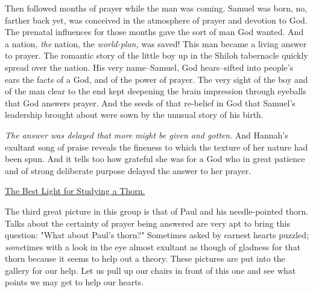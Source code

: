Then followed months of prayer while the man was coming. Samuel was born,
no, farther back yet, was conceived in the atmosphere of prayer and
devotion to God. The prenatal influences for those months gave the sort of
man God wanted. And a nation, \textit{the} nation, the \textit{world-plan,} was saved!
This man became a living answer to prayer. The romantic story of the
little boy up in the Shiloh tabernacle quickly spread over the nation. His
very name--Samuel, God hears--sifted into people's ears the facts of a
God, and of the power of prayer. The very sight of the boy and of the man
clear to the end kept deepening the brain impression through eyeballs that
God answers prayer. And the seeds of that re-belief in God that Samuel's
leadership brought about were sown by the unusual story of his birth.

\textit{The answer was delayed that more might be given and gotten}. And Hannah's
exultant song of praise reveals the fineness to which the texture of her
nature had been spun. And it tells too how grateful she was for a God who
in great patience and of strong deliberate purpose delayed the answer to
her prayer.



\underline{The Best Light for Studying a Thorn.}


The third great picture in this group is that of Paul and his
needle-pointed thorn. Talks about the certainty of prayer being answered
are very apt to bring this question: "What about Paul's thorn?" Sometimes
asked by earnest hearts puzzled; \textit{some}times with a look in the eye almost
exultant as though of gladness for that thorn because it seems to help out
a theory. These pictures are put into the gallery for our help. Let us
pull up our chairs in front of this one and see what points we may get to
help our hearts.

